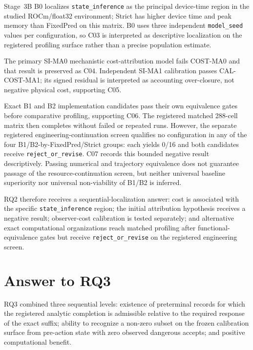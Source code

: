 Stage~3B B0 localizes \texttt{state\_inference} as the principal device-time region in
the studied ROCm/float32 environment; Strict has higher device time and peak memory
than FixedPred on this matrix. B0 uses three independent \texttt{model\_seed} values
per configuration, so C03 is interpreted as descriptive localization on the
registered profiling surface rather than a precise population estimate.

The primary SI-MA0 mechanistic cost-attribution model fails COST-MA0 and that result is
preserved as C04. Independent SI-MA1 calibration passes CAL-COST-MA1; its signed
residual is interpreted as accounting over-closure, not negative physical cost,
supporting C05.

Exact B1 and B2 implementation candidates pass their own equivalence gates before
comparative profiling, supporting C06. The registered matched 288-cell matrix then
completes without failed or repeated runs. However, the separate registered
engineering-continuation screen qualifies no configuration in any of the four
B1/B2-by-FixedPred/Strict groups: each yields 0/16 and both candidates receive
\texttt{reject\_or\_revise}. C07 records this bounded negative result descriptively.
Passing numerical and trajectory equivalence does not guarantee passage of the
resource-continuation screen, but neither universal baseline superiority nor universal
non-viability of B1/B2 is inferred.

RQ2 therefore receives a sequential-localization answer: cost is associated with the
specific \texttt{state\_inference} region; the initial attribution hypothesis receives
a negative result; observer-cost calibration is tested separately; and alternative
exact computational organizations reach matched profiling after functional-equivalence
gates but receive \texttt{reject\_or\_revise} on the registered engineering screen.

\section{Answer to RQ3}
\label{sec:conclusion-rq3-en}

RQ3 combined three sequential levels: existence of preterminal records for which the
registered analytic completion is admissible relative to the required response of the
exact suffix; ability to recognize a non-zero subset on the frozen calibration surface
from pre-action state with zero observed dangerous accepts; and positive computational
benefit.

